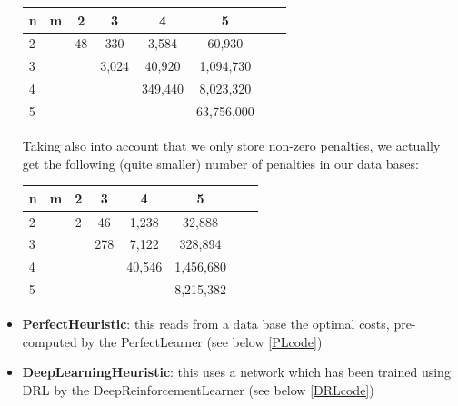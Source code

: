 \begin{itemize}
\begin{center}
\begin{tabular}{l*{6}{c}r}
n              & m & 2 & 3 & 4 & 5\\
\hline
2              &   & 48 & 330 & 3,584 & 60,930 \\
3              &   &   & 3,024  & 40,920 &  1,094,730  \\
4              &   &   &  & 349,440 & 8,023,320   \\
5              &   &   &  &  & 63,756,000   \\
\end{tabular}
\end{center}
Taking also into account that we only store non-zero penalties, we actually get the following (quite smaller) number of penalties in our data bases:
\begin{center}
\begin{tabular}{l*{6}{c}r}
n              & m & 2 & 3 & 4 & 5\\
\hline
2              &   & 2 & 46 & 1,238  & 32,888 \\
3              &   &  & 278  & 7,122 & 328,894   \\
4              &   &   &  & 40,546 &  1,456,680 \\
5              &   &   &  &  &  8,215,382 \\
\end{tabular}
\end{center}



\item \textbf{PerfectHeuristic}: this reads from a data base the optimal costs, pre-computed by the PerfectLearner (see below \ref{PLcode})
\item \textbf{DeepLearningHeuristic}: this uses a network which has been trained using DRL by the DeepReinforcementLearner (see below \ref{DRLcode})
\end{itemize}



